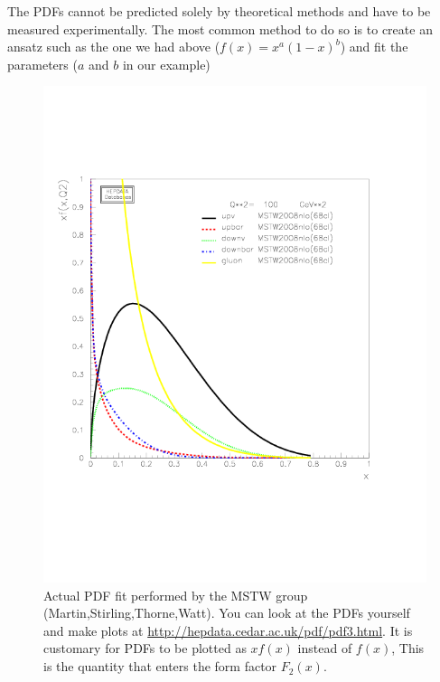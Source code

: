 \documentclass[12pt]{article}
\begin{document}
The PDFs cannot be predicted solely by theoretical methods and have to be measured experimentally. The most common method to do so is to create an ansatz such as the one we had above ($f(x)=x^a(1-x)^b$) and fit the parameters ($a$ and $b$ in our example) 
\begin{figure}[h]
  \begin{center}\includegraphics[scale=0.3,trim=20 150 50 120,clip]{images/plotpaw.png}
    \end{center}
  \caption{Actual PDF fit performed by the MSTW group (Martin,Stirling,Thorne,Watt). You can look at the PDFs yourself and make plots at \url{http://hepdata.cedar.ac.uk/pdf/pdf3.html}. It is customary for PDFs to be plotted as $xf(x)$ instead of $f(x)$, This is the quantity that enters the form factor $F_2(x)$.}
  \label{fig:pdfMSTW}
  \end{figure}
\end{document}
